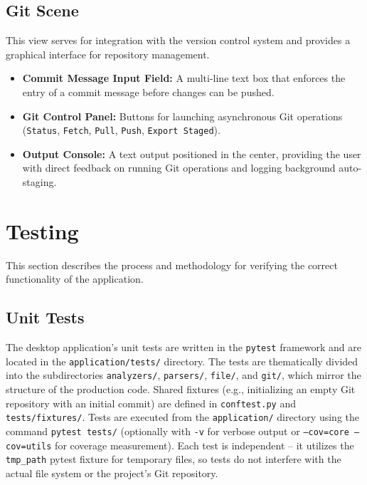 \documentclass[12pt, a4paper]{article}
\begin{document}
\subsection{Git Scene}
This view serves for integration with the version control system and provides a graphical interface for repository management.
\begin{itemize}
    \item \textbf{Commit Message Input Field:} A multi-line text box that enforces the entry of a 
    commit message before changes can be pushed.
    \item \textbf{Git Control Panel:} Buttons for launching asynchronous Git operations (\texttt{Status}, 
    \texttt{Fetch}, \texttt{Pull}, \texttt{Push}, \texttt{Export Staged}).
    \item \textbf{Output Console:} A text output positioned in the center, providing the user with 
    direct feedback on running Git operations and logging background auto-staging.
\end{itemize}

\section{Testing}

This section describes the process and methodology for verifying the correct functionality of the application.

\subsection{Unit Tests}

The desktop application's unit tests are written in the \texttt{pytest} 
framework and are located in the \texttt{application/tests/} directory. 
The tests are thematically divided into the subdirectories \texttt{analyzers/}, 
\texttt{parsers/}, \texttt{file/}, and \texttt{git/}, which mirror the structure 
of the production code. Shared fixtures (e.g., initializing an empty Git repository 
with an initial commit) are defined in \texttt{conftest.py} and \texttt{tests/fixtures/}. 
Tests are executed from the \texttt{application/} directory using the command 
\texttt{pytest tests/} (optionally with \texttt{-v} for verbose output or 
\texttt{--cov=core --cov=utils} for coverage measurement). Each test is independent -- 
it utilizes the \texttt{tmp\_path} pytest fixture for temporary files, so tests do not 
interfere with the actual file system or the project's Git repository.
\end{document}
